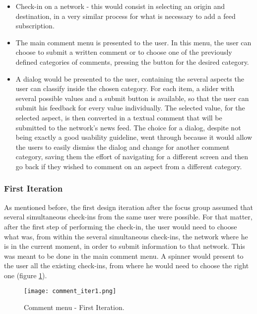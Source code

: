 \begin{itemize}
\item Check-in on a network - this would consist in selecting an origin and destination, in a very similar process for what is necessary to add a feed subscription.
\item The main comment menu is presented to the user. In this menu, the user can choose to submit a written comment or to choose one of the previously defined categories of comments, pressing the button for the desired category.
\item A dialog would be presented to the user, containing the several aspects the user can classify inside the chosen category. For each item, a slider with several possible values and a submit button is available, so that the user can submit his feedback for every value individually. The selected value, for the selected aspect, is then converted in a textual comment that will be submitted to the network's news feed. The choice for a dialog, despite not being exactly a good usability guideline, went through because it would allow the users to easily dismiss the dialog and change for another comment category, saving them the effort of navigating for a different screen and then go back if they wished to comment on an aspect from a different category.
\end{itemize}

\subsubsection{First Iteration}

As mentioned before, the first design iteration after the focus group assumed that several simultaneous check-ins from the same user were possible. For that matter, after the first step of performing the check-in, the user would need to choose what was, from within the several simultaneous check-ins, the network where he is in the current moment, in order to submit information to that network.
This was meant to be done in the main comment menu. A spinner would present to the user all the existing check-ins, from where he would need to choose the right one (figure \ref{fig:comment_iter1}).

\begin{figure}[h!]
  \begin{center}
    \leavevmode
    \texttt{[image: comment\_iter1.png]}
    \caption{Comment menu - First Iteration.}
    \label{fig:comment_iter1}
  \end{center}
\end{figure}

